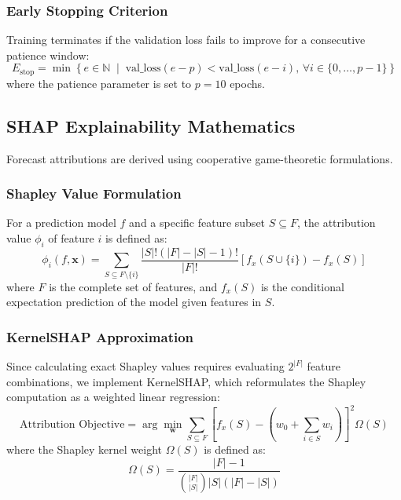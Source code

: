 \documentclass[10pt,journal,compsoc,twocolumn]{IEEEtran}
\begin{document}
\subsubsection{Early Stopping Criterion}
Training terminates if the validation loss fails to improve for a consecutive patience window:
\begin{equation}
E_{\text{stop}} = \min \left\{ e \in \mathbb{N} \;\middle|\; \text{val\_loss}(e - p) < \text{val\_loss}(e - i), \, \forall i \in \{0, \dots, p-1\} \right\}
\end{equation}
where the patience parameter is set to $p = 10$ epochs.

\subsection{SHAP Explainability Mathematics}
Forecast attributions are derived using cooperative game-theoretic formulations.

\subsubsection{Shapley Value Formulation}
For a prediction model $f$ and a specific feature subset $S \subseteq F$, the attribution value $\phi_i$ of feature $i$ is defined as:
\begin{equation}
\phi_i(f, \mathbf{x}) = \sum_{S \subseteq F \setminus \{i\}} \frac{|S|! \left(|F| - |S| - 1\right)!}{|F|!} \left[ f_x(S \cup \{i\}) - f_x(S) \right]
\end{equation}
where $F$ is the complete set of features, and $f_x(S)$ is the conditional expectation prediction of the model given features in $S$.

\subsubsection{KernelSHAP Approximation}
Since calculating exact Shapley values requires evaluating $2^{|F|}$ feature combinations, we implement KernelSHAP, which reformulates the Shapley computation as a weighted linear regression:
\begin{equation}
\text{Attribution Objective} = \arg\min_{\mathbf{w}} \sum_{S \subseteq F} \left[ f_x(S) - \left(w_0 + \sum_{i \in S} w_i\right) \right]^2 \Omega(S)
\end{equation}
where the Shapley kernel weight $\Omega(S)$ is defined as:
\begin{equation}
\Omega(S) = \frac{|F| - 1}{\binom{|F|}{|S|} |S| \left(|F| - |S|\right)}
\end{equation}
\end{document}

